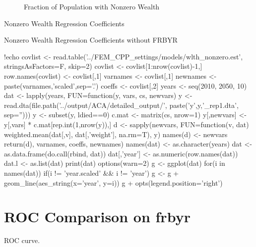 \documentclass{article}
\begin{document}
\begin{figure}[ht]
\centering
{}
\caption{Fraction of Population with Nonzero Wealth}
\end{figure}

\begin{table}[ht]
\centering
\caption{Nonzero Wealth Regression Coefficients}

\label{tab:wlthnonzero}
\end{table}

\begin{table}[ht]
\centering
\caption{Nonzero Wealth Regression Coefficients without FRBYR}

\label{tab:wlthnonzero_nofrbyr}
\end{table}

\begin{Rcode}{!echo}
covlist <- read.table('../FEM_CPP_settings/models/wlth_nonzero.est', stringsAsFactors=F, skip=2)
covlist <- covlist[1:nrow(covlist)-1,]
row.names(covlist) <- covlist[,1]
varnames <- covlist[,1]
newnames <- paste(varnames,'scaled',sep='.')
coeffs <- covlist[,2]
years <- seq(2010, 2050, 10)
dat <- lapply(years, FUN=function(y, vars, cs, newvars) {
  y <- read.dta(file.path('../output/ACA/detailed_output/', paste('y',y,'_rep1.dta', sep='')))
  y <- subset(y, ldied==0)
  c.mat <- matrix(cs, nrow=1)
  y[,newvars] <- y[,vars] * c.mat[rep.int(1,nrow(y)),]
  d <- sapply(newvars, FUN=function(v, dat) weighted.mean(dat[,v], dat[,'weight'], na.rm=T), y)
  names(d) <- newvars
  return(d)}, varnames, coeffs, newnames)
names(dat) <- as.character(years)
dat <- as.data.frame(do.call(rbind, dat))
dat[,'year'] <- as.numeric(row.names(dat))
dat.l <- as.list(dat)
print(dat)
options(warn=2)
g <- ggplot(dat)
for(i in names(dat)) {
  if(i != 'year.scaled' && i != 'year')
    g <- g + geom_line(aes_string(x='year', y=i))
}
g + opts(legend.position='right')
\end{Rcode}

\section{ROC Comparison on frbyr}

ROC curve.
\end{document}
